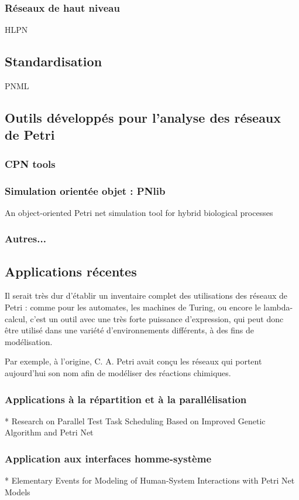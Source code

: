 \subsubsection{Réseaux de haut niveau}
HLPN

\subsection{Standardisation}
PNML %

\subsection{Outils développés pour l'analyse des réseaux de Petri}
\subsubsection{CPN tools}
\subsubsection{Simulation orientée objet : PNlib}
An object-oriented Petri net simulation tool for hybrid biological processes
\subsubsection{Autres...}

\subsection{Applications récentes}
Il serait très dur d'établir un inventaire complet des utilisations des réseaux de Petri : comme pour les automates, les machines de Turing, ou encore le lambda-calcul, c'est un outil avec une très forte puissance d'expression, qui peut donc être utilisé dans une variété d'environnements différents, à des fins de modélisation.

Par exemple, à l'origine, C. A. Petri avait conçu les réseaux qui portent aujourd'hui son nom afin de modéliser des réactions chimiques.

\subsubsection{Applications à la répartition et à la parallélisation}
* Research on Parallel Test Task Scheduling Based on Improved Genetic Algorithm and Petri Net
\subsubsection{Application aux interfaces homme-système}
* Elementary Events for Modeling of Human-System Interactions with Petri Net Models
